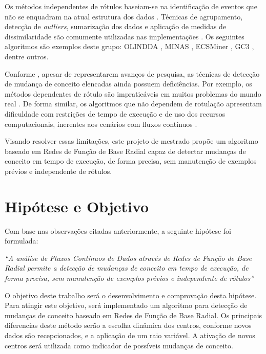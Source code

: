 \documentclass[qual, classic, a4paper]{ufbathesis}
\begin{document}
Os métodos independentes de rótulos baseiam-se na identificação de eventos que não se enquadram na atual estrutura dos dados \cite{Spinosa:2007:OCA:1244002.1244107}.
Técnicas de agrupamento, detecção de \textit{outliers}, sumarização dos dados e aplicação de medidas de dissimilaridade são comumente utilizadas nas implementações \cite{Ryu:Kantardzic:2012}.
Os seguintes algoritmos são exemplos deste grupo: 
OLINDDA \cite{Spinosa:2007:OCA:1244002.1244107},
MINAS \cite{Faria:2013:NDA:2480362.2480515},
ECSMiner \cite{Masud:2011:CNC:1978259.1978529},
GC3 \cite{Sethi2016b:GC3}, dentre outros.

Conforme \cite{Aggarwal:2006:DSM:1196418}, apesar de representarem avanços de pesquisa, as técnicas de detecção de mudança de conceito elencadas ainda possuem deficiências.
Por exemplo, os métodos dependentes de rótulo são impraticáveis em muitos problemas do mundo real \cite{Gama:2014:SCD:2597757.2523813}.
De forma similar, os algoritmos que não dependem de rotulação apresentam dificuldade com restrições de tempo de execução e de uso dos recursos computacionais, inerentes aos cenários com fluxos contínuos \cite{Gama:2010:KDD:1855075}.

Visando resolver essas limitações, este projeto de mestrado propõe um algoritmo baseado em Redes de Função de Base Radial capaz de detectar mudanças de conceito em tempo de execução, de forma precisa, sem manutenção de exemplos prévios e independente de rótulos.

\section{Hipótese e Objetivo}

Com base nas observações citadas anteriormente, a seguinte hipótese foi formulada:

\begin{center}
\textit{``A análise de Fluxos Contínuos de Dados através de Redes de Função de Base Radial permite a detecção de mudanças de conceito em tempo de execução, de forma precisa, sem manutenção de exemplos prévios e independente de rótulos''}
\end{center}

O objetivo deste trabalho será o desenvolvimento e comprovação desta hipótese.
Para atingir este objetivo, será implementado um algoritmo para detecção de mudanças de conceito baseado em Redes de Função de Base Radial. 
Os principais diferencias deste método serão a escolha dinâmica dos centros, conforme novos dados são recepcionados, e a aplicação de um raio variável.
A ativação de novos centros será utilizada como indicador de possíveis mudanças de conceito.
\end{document}
